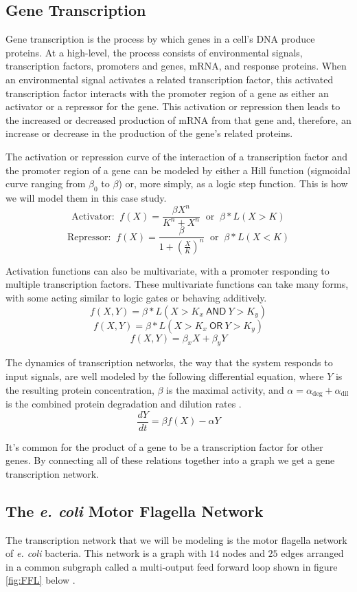 \documentclass[12pt]{article}
\begin{document}
\subsection*{Gene Transcription}
Gene transcription is the process by which genes in a cell's DNA produce proteins.
At a high-level, the process consists of environmental signals, transcription factors, promoters and genes, mRNA, and response proteins.
When an environmental signal activates a related transcription factor, this activated transcription factor interacts with the promoter region of a gene as either an activator or a repressor for the gene.
This activation or repression then leads to the increased or decreased production of mRNA from that gene and, therefore, an increase or decrease in the production of the gene's related proteins.

The activation or repression curve of the interaction of a transcription factor and the promoter region of a gene can be modeled by either a Hill function (sigmoidal curve ranging from $\beta_0$ to $\beta$) or, more simply, as a logic step function.
This is how we will model them in this case study.
$$\text{Activator: } \ f(X)=\frac{\beta X^{n}}{K^n + X^{n}} \ \text{ or } \ \beta * L(X > K)$$
$$\text{Repressor: } \ f(X)=\frac{\beta}{1 + \left(\frac{X}{K}\right)^n} \ \text{ or } \ \beta * L(X < K)$$

Activation functions can also be multivariate, with a promoter responding to multiple transcription factors.
These multivariate functions can take many forms, with some acting similar to logic gates or behaving additively.
$$f(X, Y)=\beta*L(X > K_x \ \mathsf{AND} \  Y > K_y)$$
$$f(X, Y)=\beta*L(X > K_x \ \mathsf{OR}  \ Y > K_y)$$
$$f(X, Y)=\beta_x X + \beta_y Y$$

The dynamics of transcription networks, the way that the system responds to input signals, are well modeled by the following differential equation, where $Y$ is the resulting protein concentration, $\beta$ is the maximal activity, and $\alpha=\alpha_{\text{deg}} + \alpha_{\text{dil}}$ is the combined protein degradation and dilution rates \cite{alon2019introduction}.
$$\frac{dY}{dt}=\beta f(X) - \alpha Y$$

It's common for the product of a gene to be a transcription factor for other genes.
By connecting all of these relations together into a graph we get a gene transcription network.



\subsection*{The \textit{e. coli} Motor Flagella Network}
The transcription network that we will be modeling is the motor flagella network of \textit{e. coli} bacteria.
This network is a graph with $14$ nodes and $25$ edges arranged in a common subgraph called a multi-output feed forward loop shown in figure \ref{fig:FFL} below \cite{alon2019introduction}.
\end{document}
